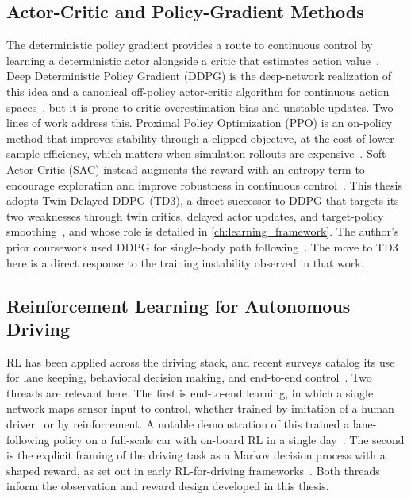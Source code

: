 \subsection{Actor-Critic and Policy-Gradient Methods}
The deterministic policy gradient provides a route to continuous control by learning a deterministic actor alongside a critic that estimates action value~\cite{silver2014dpg}. Deep Deterministic Policy Gradient (DDPG) is the deep-network realization of this idea and a canonical off-policy actor-critic algorithm for continuous action spaces~\cite{lillicrap2016ddpg}, but it is prone to critic overestimation bias and unstable updates. Two lines of work address this. Proximal Policy Optimization (PPO) is an on-policy method that improves stability through a clipped objective, at the cost of lower sample efficiency, which matters when simulation rollouts are expensive~\cite{schulman2017ppo}. Soft Actor-Critic (SAC) instead augments the reward with an entropy term to encourage exploration and improve robustness in continuous control~\cite{haarnoja2018sac}. This thesis adopts Twin Delayed DDPG (TD3), a direct successor to DDPG that targets its two weaknesses through twin critics, delayed actor updates, and target-policy smoothing~\cite{fujimoto2018td3}, and whose role is detailed in \cref{ch:learning_framework}. The author's prior coursework used DDPG for single-body path following~\cite{tymkow2024me780}. The move to TD3 here is a direct response to the training instability observed in that work.

\subsection{Reinforcement Learning for Autonomous Driving}
RL has been applied across the driving stack, and recent surveys catalog its use for lane keeping, behavioral decision making, and end-to-end control~\cite{kiran2022survey}. Two threads are relevant here. The first is end-to-end learning, in which a single network maps sensor input to control, whether trained by imitation of a human driver~\cite{codevilla2018cil} or by reinforcement. A notable demonstration of this trained a lane-following policy on a full-scale car with on-board RL in a single day~\cite{kendall2019learningdrive}. The second is the explicit framing of the driving task as a Markov decision process with a shaped reward, as set out in early RL-for-driving frameworks~\cite{sallab2017framework}. Both threads inform the observation and reward design developed in this thesis.

